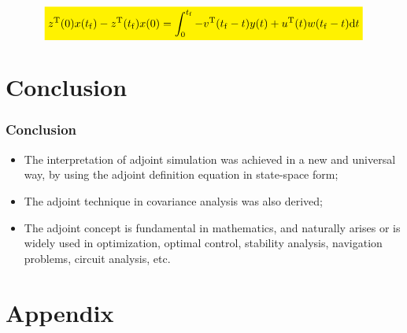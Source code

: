 \documentclass[12pt,xcolor={table},aspectratio=169]{beamer}
\begin{document}
\begin{frame}
\begin{columns}
\begin{column}[c]{0.4\paperwidth}
\begin{minipage}[c][0.6\textheight][c]{\linewidth}
\begin{figure}
\end{figure}
\end{minipage}
  \end{column}
  \end{columns}
    \footnotesize
\begin{equation}
\highlightmath{
z^{\mathrm{T}}(0)x(t_{\mathrm{f}}) - z^{\mathrm{T}}(t_{\mathrm{f}})x(0) = \int_{0}^{t_{\mathrm{f}}} -v^{\mathrm{T}}(t_{\mathrm{f}} - t)y(t)+ u^{\mathrm{T}}(t)w(t_{\mathrm{f}}-t) \mathrm{d}t }
\end{equation}
\end{frame}

\section[More]{Conclusion}
\begin{frame}
    \frametitle{Conclusion}
    \begin{itemize}
  \setlength{\itemsep}{10pt}
    \item The interpretation of adjoint simulation was achieved in a new and universal way, by using the adjoint definition equation in state-space form;
    \item The adjoint technique in covariance analysis was also derived;
    \item The adjoint concept is fundamental in mathematics, and naturally arises or is widely used in optimization, optimal control, stability analysis, navigation problems, circuit analysis, etc.
  \end{itemize}

\end{frame}






\section[Appendix]{Appendix}
\end{document}
